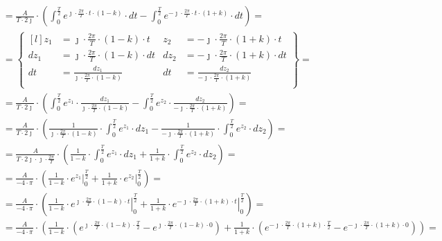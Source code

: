 \begin{task}
\begin{align*}
&=\frac{A}{T\cdot 2\jmath} \cdot \left( \int_{0}^{\frac{T}{2}}
e^{\jmath \cdot \frac{2\pi}{T} \cdot t \cdot \left(1 - k\right)} \cdot dt - \int_{0}^{\frac{T}{2}} e^{-\jmath \cdot \frac{2\pi}{T} \cdot t \cdot \left(1+k\right)} \cdot dt \right)=\\
&=\begin{Bmatrix*}[l]
z_1&=\jmath \cdot \frac{2\pi}{T} \cdot \left(1 - k\right)\cdot t &z_2&=-\jmath \cdot \frac{2\pi}{T} \cdot \left(1+k\right)\cdot t\\
dz_1&=\jmath \cdot \frac{2\pi}{T} \cdot \left(1 - k\right)\cdot dt &dz_2&=-\jmath \cdot \frac{2\pi}{T} \cdot \left(1+k\right)\cdot dt\\
dt&=\frac{dz_1}{\jmath \cdot \frac{2\pi}{T} \cdot \left(1 - k\right)} &dt&=\frac{dz_2}{-\jmath \cdot \frac{2\pi}{T} \cdot \left(1+k\right)}\\
\end{Bmatrix*}=\\
&=\frac{A}{T\cdot 2\jmath} \cdot \left( \int_{0}^{\frac{T}{2}}
e^{z_1} \cdot \frac{dz_1}{\jmath \cdot \frac{2\pi}{T} \cdot \left(1 - k\right)} - \int_{0}^{\frac{T}{2}} e^{z_2} \cdot \frac{dz_2}{-\jmath \cdot \frac{2\pi}{T} \cdot \left(1+k\right)} \right)=\\
&=\frac{A}{T\cdot 2\jmath} \cdot \left( \frac{1}{\jmath \cdot \frac{2\pi}{T} \cdot \left(1 - k\right)} \cdot \int_{0}^{\frac{T}{2}}
e^{z_1} \cdot dz_1 - \frac{1}{-\jmath \cdot \frac{2\pi}{T} \cdot \left(1+k\right)} \cdot \int_{0}^{\frac{T}{2}} e^{z_2} \cdot dz_2 \right)=\\
&=\frac{A}{T\cdot 2\jmath \cdot \jmath \cdot \frac{2\pi}{T} } \cdot \left( \frac{1}{1 - k} \cdot \int_{0}^{\frac{T}{2}}
e^{z_1} \cdot dz_1 + \frac{1}{1+k} \cdot \int_{0}^{\frac{T}{2}} e^{z_2} \cdot dz_2 \right)=\\
&=\frac{A}{-4 \cdot \pi} \cdot \left( \frac{1}{1 - k} \cdot \left.
e^{z_1} \right|_{0}^{\frac{T}{2}} + \frac{1}{1+k} \cdot \left. e^{z_2} \right|_{0}^{\frac{T}{2}} \right)=\\
&=\frac{A}{-4 \cdot \pi} \cdot \left( \frac{1}{1 - k} \cdot \left.
e^{\jmath \cdot \frac{2\pi}{T} \cdot \left(1 - k\right)\cdot t} \right|_{0}^{\frac{T}{2}} + \frac{1}{1+k} \cdot \left. e^{-\jmath \cdot \frac{2\pi}{T} \cdot \left(1+k\right)\cdot t} \right|_{0}^{\frac{T}{2}} \right)=\\
&=\frac{A}{-4 \cdot \pi} \cdot \left( \frac{1}{1 - k} \cdot \left(
e^{\jmath \cdot \frac{2\pi}{T} \cdot \left(1 - k\right)\cdot \frac{T}{2}} - e^{\jmath \cdot \frac{2\pi}{T} \cdot \left(1 - k\right)\cdot 0} \right) + \frac{1}{1+k} \cdot \left( e^{-\jmath \cdot \frac{2\pi}{T} \cdot \left(1+k\right)\cdot \frac{T}{2}} - e^{-\jmath \cdot \frac{2\pi}{T} \cdot \left(1+k\right)\cdot 0}\right) \right)=\\

\end{align*}
\end{task}
